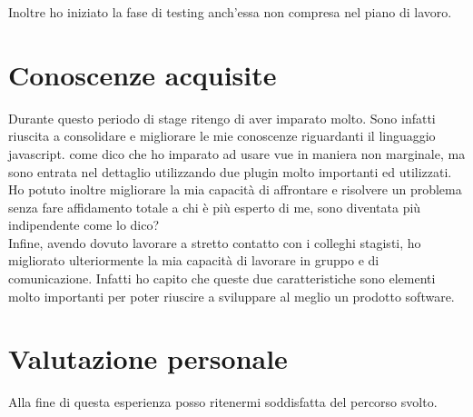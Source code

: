 Inoltre ho iniziato la fase di testing anch'essa non compresa nel piano di lavoro.

\section{Conoscenze acquisite}
\label{sec:conoscenze-acquisite}

Durante questo periodo di stage ritengo di aver imparato molto. Sono infatti riuscita a consolidare e migliorare le mie conoscenze riguardanti il linguaggio javascript. come dico che ho imparato ad usare vue in maniera non marginale, ma sono entrata nel dettaglio utilizzando due plugin molto importanti ed utilizzati.\\
Ho potuto inoltre migliorare la mia capacità di affrontare e risolvere un problema senza fare affidamento totale a chi è più esperto di me, sono diventata più indipendente come lo dico?\\
Infine, avendo dovuto lavorare a stretto contatto con i colleghi stagisti, ho migliorato ulteriormente la mia capacità di lavorare in gruppo e di comunicazione. Infatti ho capito che queste due caratteristiche sono elementi molto importanti per poter riuscire a sviluppare al meglio un prodotto software.

\section{Valutazione personale}
\label{sec:valutazione-personale}

Alla fine di questa esperienza posso ritenermi soddisfatta del percorso svolto.
